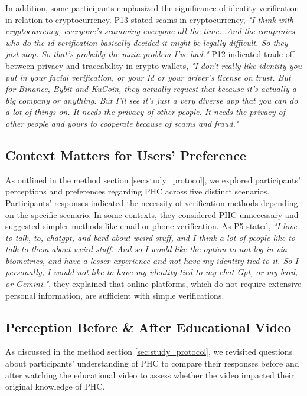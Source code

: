 In addition, some participants emphasized the significance of identity verification in relation to cryptocurrency. P13 stated scams in cryptocurrency, \textit{"I think with cryptocurrency, everyone's scamming everyone all the time...And the companies who do the id verification basically decided it might be legally difficult. So they just stop. So that's probably the main problem I've had."} P12 indicated trade-off between privacy and traceability in crypto wallets, \textit{"I don't really like identity you put in your facial verification, or your Id or your driver's license on trust. But for Binance, Bybit and KuCoin, they actually request that because it's actually a big company or anything. But I'll see it's just a very diverse app that you can do a lot of things on. It needs the privacy of other people. It needs the privacy of other people and yours to cooperate because of scams and fraud."}

\subsection{Context Matters for Users' Preference}
As outlined in the method section \ref{sec:study_protocol}, we explored participants’ perceptions and preferences regarding PHC across five distinct scenarios. Participants’ responses indicated the necessity of verification methods depending on the specific scenario. In some contexts, they considered PHC unnecessary and suggested simpler methods like email or phone verification. As P5 stated, \textit{"I love to talk, to, chatgpt, and bard about weird stuff, and I think a lot of people like to talk to them about weird stuff. And so I would like the option to not log in via biometrics, and have a lesser experience and not have my identity tied to it. So I personally, I would not like to have my identity tied to my chat Gpt, or my bard, or Gemini."}, they explained that online platforms, which do not require extensive personal information, are sufficient with simple verifications.

\subsection{Perception Before \& After Educational Video}
As discussed in the method section \ref{sec:study_protocol}, we revisited questions about participants' understanding of PHC to compare their responses before and after watching the educational video to assess whether the video impacted their original knowledge of PHC. 

